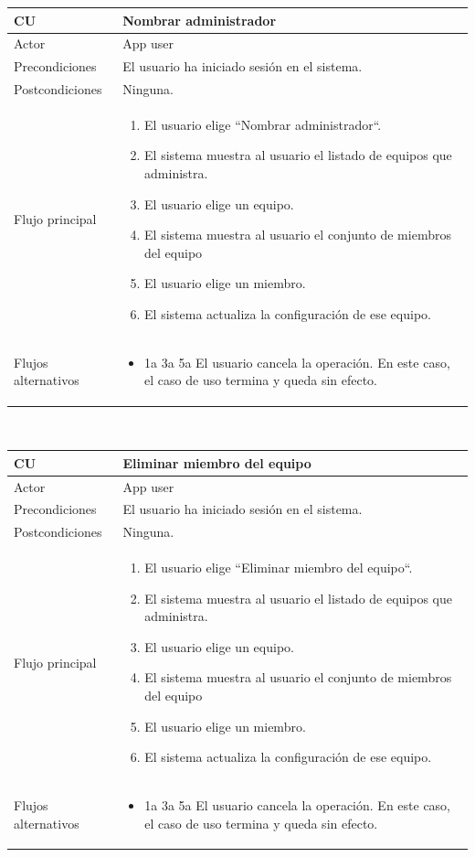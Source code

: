 \documentclass[twoside]{report}
\newcommand\addrow[2]{#1 &#2\\ }
\newcommand\addheading[2]{#1 &#2\\ \hline}
\newcommand\tabularhead{\begin{tabular}{lp{0.7\textwidth}}
\hline
}
\newenvironment{usecase}{\tabularhead}
{\hline\end{tabular}}
\begin{document}
\begin{usecase}
  \addheading{\textbf{CU\arabic{usecase}}}{Nombrar administrador} 
  \addrow{Actor}{App user}
  \addrow{Precondiciones}{El usuario ha iniciado sesión en el sistema.}
  \addrow{Postcondiciones}{Ninguna.}
  \addrow{Flujo principal}{
  		\begin{enumerate}
  		\item El usuario elige “Nombrar administrador“. %
  		\item El sistema muestra al usuario el listado de equipos que administra. %
  		\item El usuario elige un equipo. %
  		\item El sistema muestra al usuario el conjunto de miembros del equipo %
  		\item El usuario elige un miembro. %
  		\item El sistema actualiza la configuración de ese equipo. %
  		\end{enumerate}
  }
  \addrow{Flujos alternativos}{
  		\begin{itemize}
  		\item 1a 3a 5a El usuario cancela la operación. En este caso, el caso de uso termina y queda sin efecto.
  		\end{itemize}
  }
\end{usecase}\\

\begin{usecase}
  \addheading{\textbf{CU\arabic{usecase}}}{Eliminar miembro del equipo} 
  \addrow{Actor}{App user}
  \addrow{Precondiciones}{El usuario ha iniciado sesión en el sistema.}
  \addrow{Postcondiciones}{Ninguna.}
  \addrow{Flujo principal}{
  		\begin{enumerate}
  		\item El usuario elige “Eliminar miembro del equipo“. %
  		\item El sistema muestra al usuario el listado de equipos que administra. %
  		\item El usuario elige un equipo. %
  		\item El sistema muestra al usuario el conjunto de miembros del equipo %
  		\item El usuario elige un miembro. %
  		\item El sistema actualiza la configuración de ese equipo. %
  		\end{enumerate}
  }
  \addrow{Flujos alternativos}{
  		\begin{itemize}
  		\item 1a 3a 5a El usuario cancela la operación. En este caso, el caso de uso termina y queda sin efecto.
  		\end{itemize}
  }
\end{usecase}\\
\end{document}
